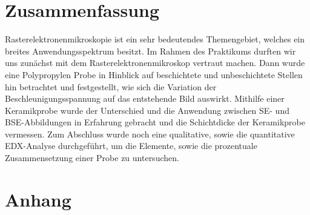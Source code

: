 \documentclass[12pt,english,ngerman]{scrartcl}
\begin{document}
\section{Zusammenfassung}

Rasterelektronenmikroskopie ist ein sehr bedeutendes Themengebiet, welches ein breites Anwendungsspektrum besitzt.
Im Rahmen des Praktikums durften wir uns zunächst mit dem Rasterelektronenmikroskop vertraut machen. Dann wurde eine
Polypropylen Probe in Hinblick auf beschichtete und unbeschichtete Stellen hin betrachtet und festgestellt, wie sich die
Variation der Beschleunigungsspannung auf das entstehende Bild auswirkt. Mithilfe einer Keramikprobe wurde der Unterschied
und die Anwendung zwischen SE- und BSE-Abbildungen in Erfahrung gebracht und die Schichtdicke der Keramikprobe vermessen.
Zum Abschluss wurde noch eine qualitative, sowie die quantitative EDX-Analyse durchgeführt, um die Elemente, sowie die 
prozentuale Zusammensetzung einer Probe zu untersuchen.

\section{Anhang}





\newpage

\printbibliography
\end{document}
